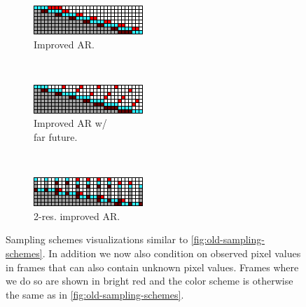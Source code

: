 \begin{figure}[t!]
    \centering
    \begin{subfigure}[t]{0.3\textwidth}
        \centering
        \includegraphics[width=\textwidth]{figures/sampling-scheme-visualizations/autoregressive-with-near-future.png}
        \caption{Improved AR.}
        \label{fig:improved-ar}
    \end{subfigure}
    ~
    \begin{subfigure}[t]{0.3\textwidth}
        \centering
        \includegraphics[width=\textwidth]{figures/sampling-scheme-visualizations/autoregressive-with-future.png}
        \caption{Improved AR w/ \\ far future.}
        \label{fig:improved-ar-w-far-future}
    \end{subfigure}
    ~
    \begin{subfigure}[t]{0.3\textwidth}
        \centering
        \includegraphics[width=\textwidth]{figures/sampling-scheme-visualizations/autoregressive-multires-3-1.png}
        \caption{2-res. improved AR.}
        \label{fig:multiscale}
    \end{subfigure}%
    \caption{Sampling schemes visualizations similar to \cref{fig:old-sampling-schemes}. In addition we now also condition on observed pixel values in frames that can also contain unknown pixel values. Frames where we do so are shown in \textcolor{observedfuturecolor}{bright red} and the color scheme is otherwise the same as in \cref{fig:old-sampling-schemes}.
    }
    \label{fig:sampling-schemes}
\end{figure}

